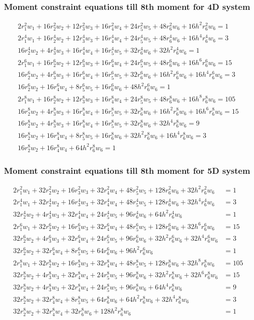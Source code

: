 \documentclass[11pt]{beamer}
\begin{document}
\begin{frame}
\frametitle{Moment constraint equations till 8th moment for 4D system}
\small
\begin{align*}
2r_1^2w_1+16r_2^2w_2+12r_3^2w_3+16r_4^2w_4+24r_5^2w_5+48r_6^2w_6+16h^2r_6^2w_6=1\\
2r_1^4w_1+16r_2^4w_2+12r_3^4w_3+16r_4^4w_4+24r_5^4w_5+48r_6^4w_6+16h^4r_6^4w_6=3\\
16r_2^4w_2+4r_3^4w_3+16r_4^4w_4+16r_5^4w_5+32r_6^4w_6+32h^2r_6^4w_6=1\\
2r_1^6w_1+16r_2^6w_2+12r_3^6w_3+16r_4^6w_4+24r_5^6w_5+48r_6^6w_6+16h^6r_6^6w_6=15\\
16r_2^6w_2+4r_3^6w_3+16r_4^6w_4+16r_5^6w_5+32r_6^6w_6+16h^2r_6^6w_6+16h^4r_6^6w_6=3\\
16r_2^6w_2+16r_4^6w_4+8r_5^6w_5+16r_6^6w_6+48h^2r_6^6w_6=1\\
2r_1^8w_1+16r_2^8w_2+12r_3^8w_3+16r_4^8w_4+24r_5^8w_5+48r_6^8w_6+16h^8r_6^8w_6=105\\
16r_2^8w_2+4r_3^8w_3+16r_4^8w_4+16r_5^8w_5+32r_6^8w_6+16h^2r_6^8w_6+16h^6r_6^8w_6=15\\
16r_2^8w_2+4r_3^8w_3+16r_4^8w_4+16r_5^8w_5+32r_6^8w_6+32h^4r_6^8w_6=9\\
16r_2^8w_2+16r_4^8w_4+8r_5^8w_5+16r_6^8w_6+32h^2r_6^8w_6+16h^4r_6^8w_6=3\\
16r_2^8w_2+16r_4^8w_4+64h^2r_6^8w_6=1
\end{align*}     
\end{frame}
\begin{frame}
\frametitle{Moment constraint equations till 8th moment for 5D system}
\small
\begin{align*}
2r_1^2w_1+32r_2^2w_2+16r_3^2w_3+32r_4^2w_4+48r_5^2w_5+128r_6^2w_6+32h^2r_6^2w_6&=1\\
2r_1^4w_1+32r_2^4w_2+16r_3^4w_3+32r_4^4w_4+48r_5^4w_5+128r_6^4w_6+32h^4r_6^4w_6&=3\\
32r_2^4w_2+4r_3^4w_3+32r_4^4w_4+24r_5^4w_5+96r_6^4w_6+64h^2r_6^4w_6&=1\\
2r_1^6w_1+32r_2^6w_2+16r_3^6w_3+32r_4^6w_4+48r_5^6w_5+128r_6^6w_6+32h^6r_6^6w_6&=15\\
32r_2^6w_2+4r_3^6w_3+32r_4^6w_4+24r_5^6w_5+96r_6^6w_6+32h^2r_6^6w_6+32h^4r_6^6w_6&=3\\
32r_2^6w_2+32r_4^6w_4+8r_5^6w_5+64r_6^6w_6+96h^2r_6^6w_6&=1\\
2r_1^8w_1+32r_2^8w_2+16r_3^8w_3+32r_4^8w_4+48r_5^8w_5+128r_6^8w_6+32h^8r_6^8w_6&=105\\
32r_2^8w_2+4r_3^8w_3+32r_4^8w_4+24r_5^8w_5+96r_6^8w_6+32h^2r_6^8w_6+32h^6r_6^8w_6&=15\\
32r_2^8w_2+4r_3^8w_3+32r_4^8w_4+24r_5^8w_5+96r_6^8w_6+64h^4r_6^8w_6&=9\\
32r_2^8w_2+32r_4^8w_4+8r_5^8w_5+64r_6^8w_6+64h^2r_6^8w_6+32h^4r_6^8w_6&=3\\
32r_2^8w_2+32r_4^8w_4+32r_6^8w_6+128h^2r_6^8w_6&=1\\
\end{align*}
\end{frame}
\end{document}
